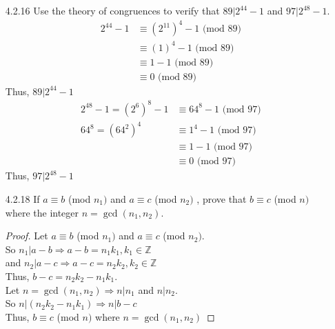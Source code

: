 \documentclass[12pt]{article}
\newcommand{\Z}{\mathds{Z}}
\begin{document}
\begin{enumerate}
\begin{proof}
			\begin{enumerate}
				\item[Case $ a= 3q+1 $] $ a^2 = (3q+1)^2=9q^2+6q+1=3(3q^2+2q)+1 $\\
					So, $ a^2-1=3(3q^2+2q) \Rightarrow 3 | a^2-1$
				\item[Case $ a = 3q+2$] $ a^2 = (3q+2)^2 = 9q^2+12q+4=3(3q^2+4q+1)+1 $\\
					So, $ a^2-1 = 3(3q^2+4q+1)+1 \Rightarrow 3 | a^2-1 $
			\end{enumerate}
			Thus, in both cases $ 3 | a^2-1 $\\
			Therefore, as $ 8|a^2-1 $, $ 3|a^2-a $, and $ \gcd(3,8)=1 , \text{ then } 24|a^2-1 \Rightarrow a^2 \equiv $(mod 24)
		\end{proof}
	\item[4.2.16] Use the theory of congruences to verify that $ 89 | 2^{44} -1 $ and $ 97|2^{48}-1 $.
	\begin{align*}
		2^{44}-1 &\equiv (2^{11})^4-1 \text{ (mod 89)}\\
				 &\equiv (1)^4-1 \text { (mod 89)}\\
				 &\equiv 1-1 \text{ (mod 89)}\\
				 &\equiv 0 \text{ (mod 89)}
	\end{align*}
	Thus, $ 89|2^{44}-1 $\\
	\begin{align*}
		2^{48}-1=(2^6)^8-1 &\equiv 64^8 -1 \text{ (mod 97)}\\
		64^8=(64^2)^4 &\equiv 1^4-1 \text { (mod 97)}\\
					  &\equiv 1-1 \text { (mod 97)}\\
					  &\equiv 0 \text{ (mod 97)}
	\end{align*}
	Thus, $97|2^{48}-1 $
	\item[4.2.18] If $ a \equiv b $ (mod $ n_1 ) $  and $ a \equiv c $ (mod $ n_2 ) $ , prove that $ b \equiv c $ (mod $ n ) $  where the integer $ n = \gcd(n_1,n_2) $.
	\begin{proof}
		Let  $ a \equiv b $ (mod $ n_1 ) $  and $ a \equiv c $ (mod $ n_2 ) $. \\
		So $ n_1 | a-b \Rightarrow a-b=n_1k_1, k_1\in\Z$ \\
		and $ n_2 | a-c \Rightarrow a-c=n_2k_2, k_2\in\Z$ \\
		Thus, $ b-c = n_2k_2-n_1k_1 $.\\
		Let $ n = \gcd(n_1,n_2)\Rightarrow n|n_1$ and $ n|n_2 $.\\
		So $ n|(n_2k_2-n_1k_1)\Rightarrow n|b-c $\\
		Thus,  $ b \equiv c $ (mod $ n ) $ where $ n = \gcd(n_1,n_2) $
	\end{proof}
\end{enumerate}
\end{document}
